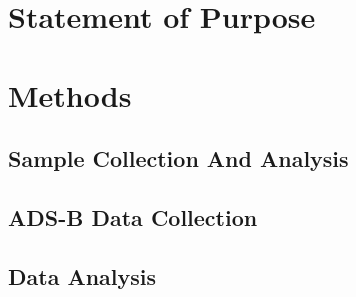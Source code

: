 \documentclass[12pt]{article}
\begin{document}
\section{Statement of Purpose}
\section{Methods}
\subsection{Sample Collection And Analysis}
\subsection{ADS-B Data Collection}
\subsection{Data Analysis}
\newpage
\printbibliography
\end{document}
